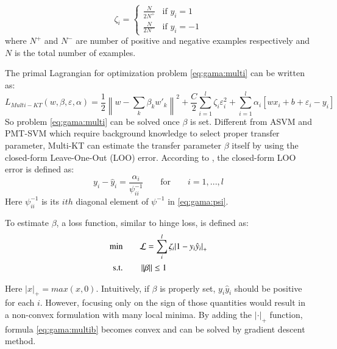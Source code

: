 \begin{equation*}
{\zeta _i} = \left\{ {\begin{array}{*{20}{c}}
	{\frac{N}{{2{N^ + }}}}&{{\text{if }}{y_i} =1}\\
	{\frac{N}{{2{N^ - }}}}&{{\text{if }}{y_i} =- 1}
	\end{array}} \right.
\end{equation*}
where $N^+$ and $N^-$ are number of positive and negative examples respectively and $N$ is the total number of examples. 

The primal Lagrangian for optimization problem \eqref{eq:gama:multi} can be written as:
\begin{equation}
{L_{Multi - KT}}\left( {w,\beta ,\varepsilon ,\alpha } \right) = \frac{1}{2}{\left\| {w - \sum\limits_k {{\beta _k}} {{w'}_k}} \right\|^2} + \frac{C}{2}\sum\limits_{i = 1}^l {{\zeta _i}\varepsilon _i^2}  + \sum\limits_{i = 1}^l {{\alpha _i}\left[ {w{x_i} + b + {\varepsilon _i} - {y_i}} \right]} 
\end{equation}
So problem \eqref{eq:gama:multi} can be solved once $\beta$ is set.
Different from ASVM and PMT-SVM which require background knowledge to select proper transfer parameter, Multi-KT can estimate the transfer parameter $\beta$ itself by using the closed-form Leave-One-Out (LOO) error. According to \cite{cawley2006leave}, the closed-form LOO error is defined as:
\begin{equation}\label{eq:gama:loo}
{y_{i}} - {\hat y_{i}} = \frac{{{\alpha _{i}}}}{{\psi_{ii}^{ - 1}}}{\qquad\text{for}}\qquad i = 1,...,l
\end{equation}
Here $\psi_{ii}^{-1}$ is its $ith$ diagonal element of $\psi^{-1}$ in \eqref{eq:gama:psi}.

To estimate $\beta$, a loss function, similar to hinge loss, is defined as: 
\begin{equation}\label{eq:gama:multib}
\begin{aligned}
\text{min} \qquad&{\cal L} = \sum\limits_i^l {{\zeta _i}{{\left| {1 - {y_i}{{\hat y}_i}} \right|}_ + }} \\
\text{s.t.} \qquad& \left\| \beta  \right\| \le 1
\end{aligned}
\end{equation}

Here $|x|_+=max(x,0)$. Intuitively, if $\beta$ is properly set, ${y_i}{{\hat y}_i}$ should be positive for each $i$. However, focusing only on the sign of those quantities would result in a non-convex formulation with many local minima. By adding the $|\cdot|_+$ function, formula \eqref{eq:gama:multib} becomes convex and can be solved by gradient descent method.

